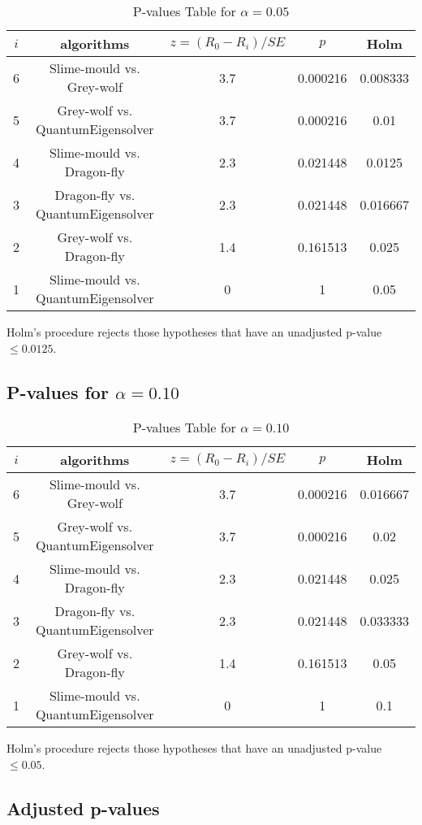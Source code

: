 \documentclass[a4paper,10pt]{article}
\begin{document}
\begin{landscape}
\begin{table}[!htp]
\centering\scriptsize
\begin{tabular}{ccccc}
$i$&algorithms&$z=(R_0 - R_i)/SE$&$p$&Holm\\
\hline6&Slime-mould vs. Grey-wolf&3.7&0.000216&0.008333\\
5&Grey-wolf vs. QuantumEigensolver&3.7&0.000216&0.01\\
4&Slime-mould vs. Dragon-fly&2.3&0.021448&0.0125\\
3&Dragon-fly vs. QuantumEigensolver&2.3&0.021448&0.016667\\
2&Grey-wolf vs. Dragon-fly&1.4&0.161513&0.025\\
1&Slime-mould vs. QuantumEigensolver&0&1&0.05\\
\hline
\end{tabular}
\caption{P-values Table for $\alpha=0.05$}
\end{table}Holm's procedure rejects those hypotheses that have an unadjusted p-value $\le0.0125$.

\pagebreak

\subsection{P-values for $\alpha=0.10$}

\begin{table}[!htp]
\centering\scriptsize
\begin{tabular}{ccccc}
$i$&algorithms&$z=(R_0 - R_i)/SE$&$p$&Holm\\
\hline6&Slime-mould vs. Grey-wolf&3.7&0.000216&0.016667\\
5&Grey-wolf vs. QuantumEigensolver&3.7&0.000216&0.02\\
4&Slime-mould vs. Dragon-fly&2.3&0.021448&0.025\\
3&Dragon-fly vs. QuantumEigensolver&2.3&0.021448&0.033333\\
2&Grey-wolf vs. Dragon-fly&1.4&0.161513&0.05\\
1&Slime-mould vs. QuantumEigensolver&0&1&0.1\\
\hline
\end{tabular}
\caption{P-values Table for $\alpha=0.10$}
\end{table}Holm's procedure rejects those hypotheses that have an unadjusted p-value $\le0.05$.

\pagebreak

\subsection{Adjusted p-values}


\end{landscape}
\end{document}
